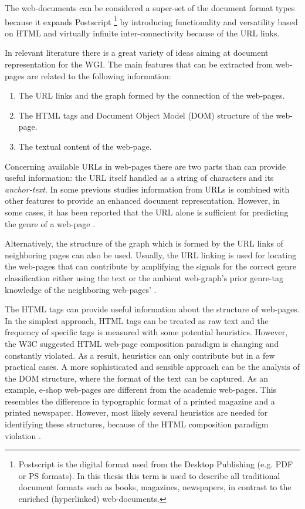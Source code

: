 The web-documents can be considered a super-set of the document format types because it expands Postscript \footnote{Postscript is the digital format used from the Desktop Publishing (e.g. PDF or PS formats). In this thesis this term is used to describe all traditional document formats such as books, magazines, newspapers, in contrast to the enriched (hyperlinked) web-documents.} by introducing functionality and versatility based on HTML and virtually infinite inter-connectivity because of the URL links. 

In relevant literature there is a great variety of ideas aiming at document representation for the WGI. The main features that can be extracted from web-pages are related to the following information:

\begin{enumerate}
\item The URL links and the graph formed by the connection of the web-pages.
\item The HTML tags and Document Object Model (DOM) structure of the web-page. 
\item The textual content of the web-page.
\end{enumerate}

Concerning available URLs in web-pages there are two parts than can provide useful information: the URL itself handled as a string of characters and its \textit{anchor-text}. In some previous studies information from URLs is combined with other features to provide an enhanced document representation. However, in some cases, it has been reported that the URL alone is sufficient for predicting the genre of a web-page \parencite{abramson2012_URL,asheghi2014semi,jebari2014pure_URL,priyatam2013don_URL,zhu2011enhance}.

Alternatively, the structure of the graph which is formed by the URL links of neighboring pages can also be used. Usually, the URL linking is used for locating the web-pages that can contribute by amplifying the signals for the correct genre classification either using the text or the ambient web-graph's prior genre-tag knowledge of the neighboring web-pages' \parencite{abramson2012_URL,asheghi2014semi,jebari2014pure_URL,priyatam2013don_URL,zhu2011enhance}.

The HTML tags can provide useful information about the structure of web-pages. In the simplest approach, HTML tags can be treated as raw text and the frequency of specific tags is measured with some potential heuristics. However, the W3C suggested HTML web-page composition paradigm is changing and constantly violated. As a result, heuristics can only contribute but in a few practical cases. A more sophisticated and sensible approach can be the analysis of the DOM structure, where the format of the text can be captured. As an example, e-shop web-pages are different from the academic web-pages. This resembles the difference in typographic format of a printed magazine and a printed newspaper. However, most likely several heuristics are needed for identifying these structures, because of the HTML composition paradigm violation \parencite{mehler2011integrating,mehler2011integrating}.


